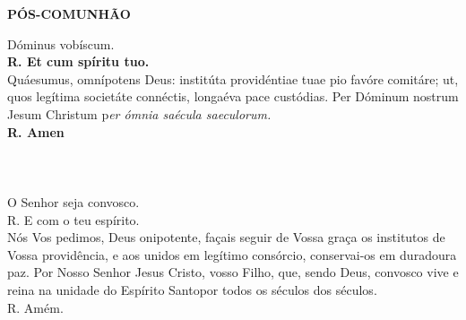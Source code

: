 \begin{center}
	\textbf{PÓS-COMUNHÃO}
\end{center}
\begin{multicols}{2}
	\noindent Dóminus vobíscum.
	\\\textbf{R. Et cum spíritu tuo. }
	\\ Quáesumus, omnípotens Deus: institúta providéntiae tuae pio favóre comitáre; ut, quos legítima societáte connéctis, longaéva pace custódias. Per Dóminum nostrum Jesum Christum p\textit{er ómnia saécula saeculorum.}
	\\ \textbf{R. Amen }
	\\
	\\
	\\
	\\O Senhor seja convosco.
	\\R. E com o teu espírito.
	\\ Nós Vos pedimos, Deus onipotente, façais seguir de Vossa graça os institutos de Vossa providência, e aos unidos em legítimo consórcio, conservai-os em duradoura paz. Por Nosso Senhor Jesus Cristo, vosso Filho, que, sendo Deus, convosco vive e reina na unidade do Espírito Santopor todos os séculos dos séculos.
	\\ R. Amém.
\end{multicols}